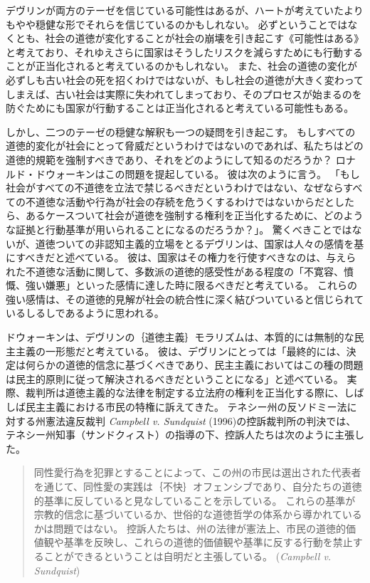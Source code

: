 \documentclass[paper=a4,book,openany]{jlreq}
\newcommand{\ig}[1]{}           %
\begin{document}
デヴリン\ig{Patrick Devlin}が両方のテーゼを信じている可能性はあるが、ハートが考えていたよりもやや穏健な形でそれらを信じているのかもしれない。
必ずということではなくとも、社会の道徳が変化することが社会の崩壊を引き起こす《可能性はある》と考えており、それゆえさらに国家はそうしたリスクを減らすためにも行動することが正当化されると考えているのかもしれない。
また、社会の道徳の変化が必ずしも古い社会の死を招くわけではないが、もし社会の道徳が大きく変わってしまえば、古い社会は実際に失われてしまっており、そのプロセスが始まるのを防ぐためにも国家が行動することは正当化されると考えている可能性もある。

しかし、二つのテーゼの穏健な解釈も一つの疑問を引き起こす。
もしすべての道徳的変化が社会にとって脅威だというわけではないのであれば、私たちはどの道徳的規範を強制すべきであり、それをどのようにして知るのだろうか？ ロナルド・ドウォーキン\ig{Ronald Dworkin}はこの問題を提起している。
彼は次のように言う。
「もし社会がすべての不道徳を立法で禁じるべきだというわけではない、なぜならすべての不道徳な活動や行為が社会の存続を危うくするわけではないからだとしたら、あるケースついて社会が道徳を強制する権利を正当化するために、どのような証拠と行動基準が用いられることになるのだろうか？」\citep{dworkin77:_takin_right_serious}。
驚くべきことではないが、道徳ついての非認知主義的立場をとるデヴリン\ig{Patrick Devlin}は、国家は人々の感情を基にすべきだと述べている。
彼は、国家はその権力を行使すべきなのは、与えられた不道徳な活動に関して、多数派の道徳的感受性がある程度の「不寛容、憤慨、強い嫌悪」といった感情に達した時に限るべきだと考えている\citep[p.17]{devlin65:_enfor_moral}。
これらの強い感情は、その道徳的見解が社会の統合性に深く結びついていると信じられているしるしであるように思われる。

ドウォーキン\ig{Ronald Dworkin}は、デヴリン\ig{Patrick Devlin}の｛道徳主義｝{モラリズム}は、本質的には無制的な民主主義の一形態だと考えている。
彼は、デヴリン\ig{Patrick Devlin}にとっては「最終的には、決定は何らかの道徳的信念に基づくべきであり、民主主義においてはこの種の問題は民主的原則に従って解決されるべきだということになる」と述べている\citep[pp.246--247]{dworkin77:_takin_right_serious}。
実際、裁判所は道徳主義的な法律を制定する立法府の権利を正当化する際に、しばしば民主主義における市民の特権に訴えてきた。
テネシー州の反ソドミー法に対する州憲法違反裁判 \emph{Campbell v. Sundquist} (1996)の控訴裁判所の判決では、テネシー州知事（サンドクィスト）の指導の下、控訴人たちは次のように主張した。

\begin{quote}
同性愛行為を犯罪とすることによって、この州の市民は選出された代表者を通じて、同性愛の実践は｛不快｝{オフェンシブ}であり、自分たちの道徳的基準に反していると見なしていることを示している。
これらの基準が宗教的信念に基づいているか、世俗的な道徳哲学の体系から導かれているかは問題ではない。
控訴人たちは、州の法律が憲法上、市民の道徳的価値観や基準を反映し、これらの道徳的価値観や基準に反する行動を禁止することができるということは自明だと主張している。
(\emph{Campbell v. Sundquist}\ig{, 926 SW 2d 250, Tenn: Court of Appeals, Western Section 1996})
\end{quote}
\end{document}

